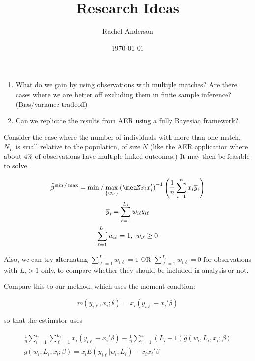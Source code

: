 \documentclass[11pt]{amsart}
\title{Research Ideas}
\author{Rachel Anderson}
\date{\today}                                           %
\newcommand{\meanN}{\frac{1}{n}\sum_{i=1}^n}
\newcommand{\sumL}{\sum_{\ell=1}^{L_i}}
\begin{document}
\maketitle


\begin{enumerate} 
\item What do we gain by using observations with multiple matches?  Are there cases where we are better off excluding them in finite sample inference? (Bias/variance tradeoff)

\item Can we replicate the results from AER using a fully Bayesian framework?     

 \end{enumerate}

Consider the case where the number of individuals with more than one match, $N_{L}$ is small relative to the population, of size $N$ (like the AER application where about 4\% of observations have multiple linked outcomes.)  It may then be feasible to solve:

\begin{gather*}\hat{\beta}^{\min/\max} = \min/\max_{\{w_{i\ell}\}} \left(\meaN x_ix_i'\right)^{-1} \left(\meanN x_i \overline{y}_i \right) \\
\overline{y}_i = \sumL w_{i\ell} y_{i\ell} \\
\sumL w_{i\ell} = 1, \ w_{i\ell} \geq 0  \end{gather*}


Also, we can try alternating $\sumL w_{i\ell} = 1$ OR $\sumL w_{i\ell} = 0$ for observations with $L_i>1$ only, to compare whether they should be included in analysis or not.   


Compare this to our method, which uses the moment condtion:

$$m(y_{i\ell}, x_i; \theta) = x_i(y_{i\ell}-x_i'\beta)  $$ 

so that the estimator uses

\begin{gather*} \meanN \sumL   x_i(y_{i\ell}-x_i'\beta)   - \meanN (L_i-1) \hat{g}(w_i, L_i, x_i; \beta) \\
 g(w_i, L_i, x_i; \beta) = x_i E(y_{i\ell} | w_i, L_i) - x_ix_i'\beta
\end{gather*} 
\end{document}
